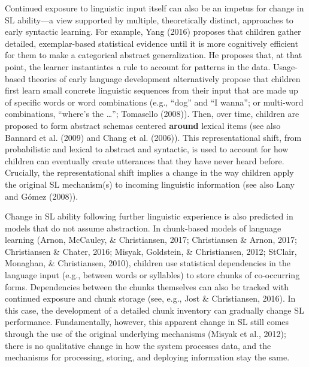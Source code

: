 \documentclass[
  english,
  man,mask,floatsintext]{apa6}
\begin{document}
Continued exposure to linguistic input itself can also be an impetus for change in SL ability---a view supported by multiple, theoretically distinct, approaches to early syntactic learning. For example, Yang (2016) proposes that children gather detailed, exemplar-based statistical evidence until it is more cognitively efficient for them to make a categorical abstract generalization. He proposes that, at that point, the learner instantiates a rule to account for patterns in the data. Usage-based theories of early language development alternatively propose that children first learn small concrete linguistic sequences from their input that are made up of specific words or word combinations (e.g., \enquote{dog} and \enquote{I wanna}; or multi-word combinations, \enquote{where's the \ldots{}}; Tomasello (2008)). Then, over time, children are proposed to form abstract schemas centered \textbf{around} lexical items (see also Bannard et al. (2009) and Chang et al. (2006)). This representational shift, from probabilistic and lexical to abstract and syntactic, is used to account for how children can eventually create utterances that they have never heard before. Crucially, the representational shift implies a change in the way children apply the original SL mechanism(s) to incoming linguistic information (see also Lany and Gómez (2008)).

Change in SL ability following further linguistic experience is also predicted in models that do not assume abstraction. In chunk-based models of language learning (Arnon, McCauley, \& Christiansen, 2017; Christiansen \& Arnon, 2017; Christiansen \& Chater, 2016; Misyak, Goldstein, \& Christiansen, 2012; StClair, Monaghan, \& Christiansen, 2010), children use statistical dependencies in the language input (e.g., between words or syllables) to store chunks of co-occurring forms. Dependencies between the chunks themselves can also be tracked with continued exposure and chunk storage (see, e.g., Jost \& Christiansen, 2016). In this case, the development of a detailed chunk inventory can gradually change SL performance. Fundamentally, however, this apparent change in SL still comes through the use of the original underlying mechanisms (Misyak et al., 2012); there is no qualitative change in how the system processes data, and the mechanisms for processing, storing, and deploying information stay the same.
\end{document}
